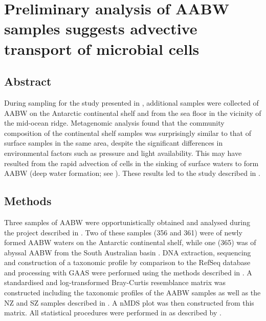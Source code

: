 \chapter[Deep water formation]{Preliminary analysis of \ac{AABW} samples suggests advective transport of microbial cells}
\label{ch:deepwaterformation}

\section{Abstract}

During sampling for the study presented in , additional samples were collected of \ac{AABW} on the Antarctic continental shelf and from the sea floor in the vicinity of the mid-ocean ridge.
Metagenomic analysis found that the community composition of the continental shelf samples was surprisingly similar to that of surface samples in the same area, despite the significant differences in environmental factors such as pressure and light availability.
This may have resulted from the rapid advection of cells in the sinking of surface waters to form \ac{AABW} (deep water formation; see ).
These results led to the study described in .

\section{Methods}




Three samples of \ac{AABW} were opportunistically obtained and analysed during the project described in  .
Two of these samples (356 and 361) were of newly formed \ac{AABW} waters on the Antarctic continental shelf, while one (365) was of abyssal \ac{AABW} from the South Australian basin .
DNA extraction, sequencing and construction of a taxonomic profile by  comparison to the RefSeq database and processing with \ac{GAAS} were performed using the methods described in .
A standardised and log-transformed Bray-Curtis resemblance matrix was constructed including the taxonomic profiles of the \ac{AABW} samples as well as the \ac{NZ} and \ac{SZ} samples described in .
A \ac{nMDS} plot was then constructed from this matrix.
All statistical procedures were performed in  as described by \citet{Clarke:2001ut}.

